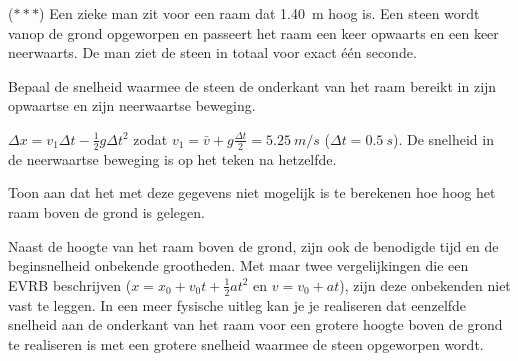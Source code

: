 \documentclass{ximera}
\begin{document}
\begin{exercise}
    ($\ast\ast\ast$) Een zieke man zit voor een raam dat \SI{1,40}{m} hoog is. Een steen wordt vanop de grond opgeworpen en passeert het raam een keer opwaarts en een keer neerwaarts. De man ziet de steen in totaal voor exact één seconde.%

    \begin{question} Bepaal de snelheid waarmee de steen de onderkant van het raam bereikt in zijn opwaartse en zijn neerwaartse beweging.  
        \begin{oplossing} $\Delta x= v_1\Delta t-\frac{1}{2}g\Delta t^2$ zodat $v_1=\bar{v}+g\frac{\Delta t}{2}=\SI{5,25}{m/s}$ ($\Delta t = \SI{0,5}{s}$). De snelheid in de neerwaartse beweging is op het teken na hetzelfde.
        \end{oplossing} 
    \end{question} %
    
    \begin{question} Toon aan dat het met deze gegevens niet mogelijk is te berekenen hoe hoog het raam boven de grond is gelegen. 
        \begin{oplossing} Naast de hoogte van het raam boven de grond, zijn ook de benodigde tijd en de beginsnelheid onbekende grootheden. Met maar twee vergelijkingen die een EVRB beschrijven ($x=x_0+v_0t+\frac{1}{2}at^2$ en $v=v_0+at$), zijn deze onbekenden niet vast te leggen. 
        In een meer fysische uitleg kan je je realiseren dat eenzelfde snelheid aan de onderkant van het raam voor een grotere hoogte boven de grond te realiseren is met een grotere snelheid waarmee de steen opgeworpen wordt. 
        \end{oplossing} 
    \end{question} 
\end{exercise}
\end{document}
